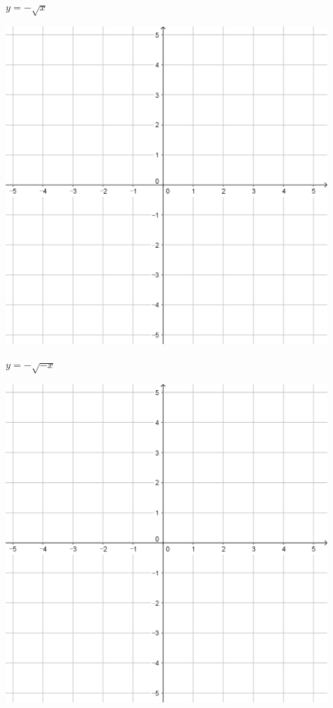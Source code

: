 \documentclass[a4paper]{oblivoir}
\begin{document}
\begin{minipage}{0.45\textwidth}\centering
\(y=-\sqrt x\)
\par\bigskip\includegraphics[width=0.9\textwidth]{55}
\end{minipage}
\begin{minipage}{0.45\textwidth}\centering
\(y=-\sqrt{-x}\)
\par\bigskip\includegraphics[width=0.9\textwidth]{55}
\end{minipage}\bigskip\bigskip\par
\end{document}
